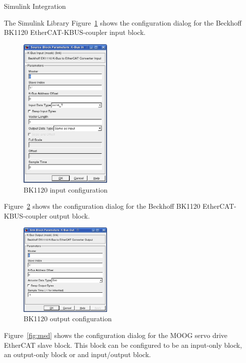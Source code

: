 \begin{ighsec}{Simulink Integration}
\begin{ighsec}{The Simulink Library}
Figure~\ref{fig:bk1120-in} shows the configuration dialog for the Beckhoff
BK1120 EtherCAT-KBUS-coupler input block.

\begin{figure}[H]
  \begin{center}
    \includegraphics[width=0.4\textwidth]{images/bk1120-in.png}
    \caption{BK1120 input configuration}
    \label{fig:bk1120-in}
  \end{center}
\end{figure}

Figure~\ref{fig:bk1120-out} shows the configuration dialog for the Beckhoff
BK1120 EtherCAT-KBUS-coupler output block.

\begin{figure}[H]
  \begin{center}
    \includegraphics[width=0.4\textwidth]{images/bk1120-out.png}
    \caption{BK1120 output configuration}
    \label{fig:bk1120-out}
  \end{center}
\end{figure}

Figure~\ref{fig:msd} shows the configuration dialog for the MOOG servo drive
EtherCAT slave block. This block can be configured to be an input-only block,
an output-only block or and input/output block.


\end{ighsec}
\end{ighsec}
